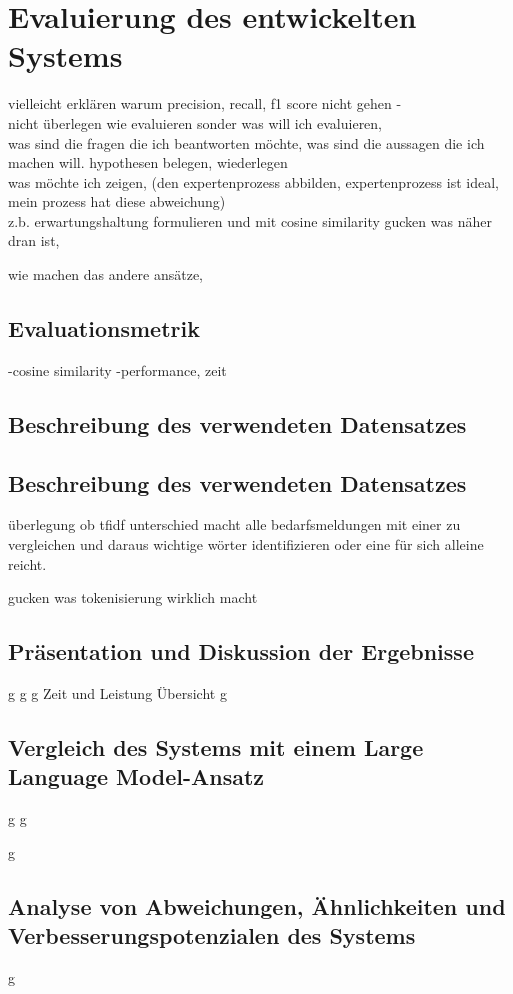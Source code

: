 \chapter{Evaluierung des entwickelten Systems}
\label{chap:evaluierung}

vielleicht erklären warum precision, recall, f1 score nicht gehen -\\

nicht überlegen wie evaluieren sonder was will ich evaluieren,\\
was sind die fragen die ich beantworten möchte, was sind die aussagen die ich machen will. hypothesen belegen, wiederlegen\\
was möchte ich zeigen, (den expertenprozess abbilden, expertenprozess ist ideal, mein prozess hat diese abweichung)\\

z.b. erwartungshaltung formulieren und mit cosine similarity gucken was näher dran ist,

wie machen das andere ansätze,

\section{Evaluationsmetrik}
-cosine similarity
-performance, zeit

\section{Beschreibung des verwendeten Datensatzes}
\newpage

\section{Beschreibung des verwendeten Datensatzes}

überlegung ob tfidf unterschied macht alle bedarfsmeldungen mit einer zu vergleichen und daraus wichtige wörter identifizieren oder eine für sich alleine reicht.

gucken was tokenisierung wirklich macht
\section{Präsentation und Diskussion der Ergebnisse}
\newpage
g
\newpage
g
\newpage
g
\newpage
Zeit und Leistung Übersicht
\newpage
g
\newpage

\section{Vergleich des Systems mit einem Large Language Model-Ansatz}
\newpage
g
\newpage
g
\newpage

g
\newpage

\section{Analyse von Abweichungen, Ähnlichkeiten und Verbesserungspotenzialen des Systems}
\newpage
g
\newpage